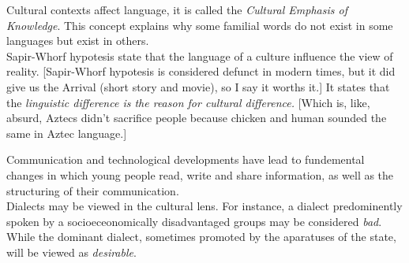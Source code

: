 \documentclass[11pt,a4paper]{book}
\begin{document}
Cultural contexts affect language, it is called the \textit{Cultural Emphasis of Knowledge}. This concept explains why some familial words do not exist in some languages but exist in others.\\

Sapir-Whorf hypotesis state that the language of a culture influence the view of reality. [Sapir-Whorf hypotesis is considered defunct in modern times, but it did give us the Arrival (short story and movie), so I say it worths it.] It states that the \textit{linguistic difference is the reason for cultural difference.} [Which is, like, absurd, Aztecs didn't sacrifice people because chicken and human sounded the same in Aztec language.]

Communication and technological developments have lead to fundemental changes in which young people read, write and share information, as well as the structuring of their communication.\\

Dialects may be viewed in the cultural lens. For instance, a dialect predominently spoken by a socioeceonomically disadvantaged groups may be considered \textit{bad}. While the dominant dialect, sometimes promoted by the aparatuses of the state, will be viewed as \textit{desirable}. 
\end{document}
